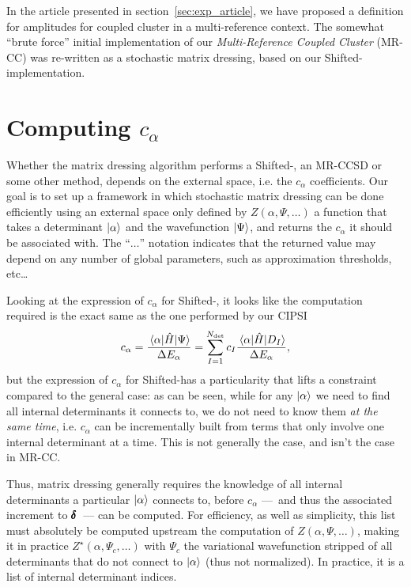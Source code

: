 \documentclass[./thesis.tex]{subfiles}
\begin{document}
In the article presented in section~\ref{sec:exp_article}, we have proposed a definition for amplitudes for coupled cluster in a multi-reference context. The somewhat ``brute force'' initial implementation of our \emph{Multi-Reference Coupled Cluster} (MR-CC) was re-written as a stochastic matrix dressing, based on our Shifted-\Bk implementation.

\section{Computing $c_\alpha$}
Whether the matrix dressing algorithm performs a Shifted-\Bk, an MR-CCSD or some other method, depends on the external space, i.e. the $c_\alpha$ coefficients. Our goal is to set up a framework in which stochastic matrix dressing can be done efficiently using an external space only defined by $Z(\alpha, \Psi, \ldots)$ a function that takes a determinant ${\ket{\alpha}}$ and the wavefunction $\ket \Psi$, and returns the $c_\alpha$ it should be associated with. The ``$\ldots$'' notation indicates that the returned value may depend on any number of global parameters, such as approximation thresholds, etc\dots

Looking at the expression of $c_\alpha$ for Shifted-\Bk, it looks like the computation required is the exact same as the one performed by our CIPSI
\begin{equation}
c_\alpha = \frac{\mel{\alpha}{\hat{H}}{\Psi}}{\Delta E_\alpha} = \sum_{I=1}^{{N_\text{det}}} c_I \frac{\mel{\alpha}{\hat{H}}{D_I}}{\Delta E_\alpha},
\end{equation}
but the expression of $c_\alpha$ for Shifted-\Bk has a particularity that lifts a constraint compared to the general case: as can be seen, while for any ${\ket{\alpha}}$ we need to find all internal determinants it connects to, we do not need to know them \emph{at the same time}, i.e. $c_\alpha$ can be incrementally built from terms that only involve one internal determinant at a time. This is not generally the case, and isn't the case in MR-CC.

Thus, matrix dressing generally requires the knowledge of all internal determinants a particular ${\ket{\alpha}}$ connects to, before $c_\alpha$ ---~and thus the associated increment to $\pmb \delta$~--- can be computed. For efficiency, as well as simplicity, this list must absolutely be computed upstream the computation of $Z(\alpha, \Psi, \ldots)$, making it in practice $Z^\star(\alpha, \Psi_{c}, \ldots)$ with $\Psi_{c}$ the variational wavefunction stripped of all determinants that do not connect to ${\ket{\alpha}}$ (thus not normalized). In practice, it is a list of internal determinant indices.
\end{document}
